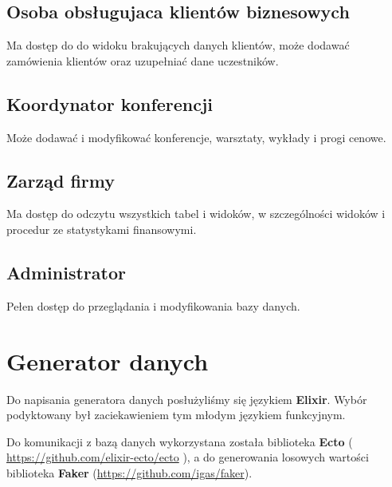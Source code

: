 \documentclass[12pt]{article}
\begin{document}
\subsection{Osoba obsługujaca klientów biznesowych}
Ma dostęp do do widoku brakujących danych klientów, może dodawać zamówienia klientów oraz uzupełniać dane uczestników.

\subsection{Koordynator konferencji}
Może dodawać i modyfikować konferencje, warsztaty, wykłady i progi cenowe.

\subsection{Zarząd firmy}
Ma dostęp do odczytu wszystkich tabel i widoków, w szczególności widoków i procedur ze statystykami finansowymi.

\subsection{Administrator}
Pełen dostęp do przeglądania i modyfikowania bazy danych.


\section{Generator danych}

Do napisania generatora danych posłużyliśmy się językiem \textbf{Elixir}. Wybór podyktowany był zaciekawieniem tym młodym językiem funkcyjnym.

Do komunikacji z bazą danych wykorzystana została biblioteka \textbf{Ecto} ( \url{https://github.com/elixir-ecto/ecto} ), a do generowania losowych wartości biblioteka \textbf{Faker} (\url{https://github.com/igas/faker}).



\end{document}
